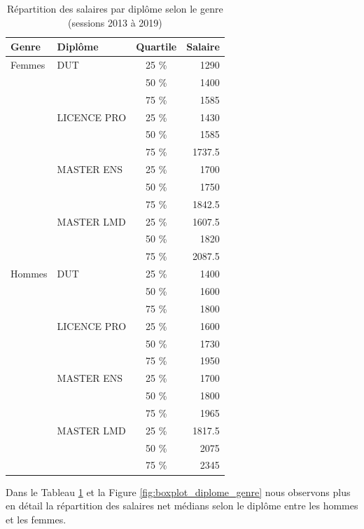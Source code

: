 \documentclass[12pt, a4paper, titlepage, table]{article}
\begin{document}
	\begin{table}[H]
		\centering
		\begin{tabular}{llcr}
			\toprule
			\textbf{Genre} & \textbf{Diplôme} & \textbf{Quartile} & \textbf{Salaire} \\
			\midrule
			Femmes & DUT & 25 \% & 1290 \\
			&     & 50 \% & 1400 \\
			&     & 75 \% & 1585 \\
			\cmidrule{2-4}
			& LICENCE PRO & 25 \% & 1430 \\
			&             & 50 \% & 1585 \\
			&             & 75 \% & 1737.5 \\
			\cmidrule{2-4}
			& MASTER ENS & 25 \% & 1700 \\
			&            & 50 \% & 1750 \\
			&            & 75 \% & 1842.5 \\
			\cmidrule{2-4}
			& MASTER LMD & 25 \% & 1607.5 \\
			&            & 50 \% & 1820 \\
			&            & 75 \% & 2087.5 \\
			\midrule
			Hommes & DUT & 25 \%& 1400 \\
			&     		& 50 \% & 1600 \\
			&     & 75 \% & 1800 \\
			\cmidrule{2-4}
			& LICENCE PRO & 25 \% & 1600 \\
			&             & 50 \% & 1730 \\
			&             & 75 \% & 1950 \\
			\cmidrule{2-4}
			& MASTER ENS & 25 \% & 1700 \\
			&            & 50 \% & 1800 \\
			&            & 75 \% & 1965 \\
			\cmidrule{2-4}
			& MASTER LMD & 25 \% & 1817.5 \\
			&            & 50 \% & 2075 \\
			&            & 75 \% & 2345 \\
			\bottomrule
		\end{tabular}
		\caption{Répartition des salaires par diplôme selon le genre (sessions 2013 à 2019)}
		\label{tab:quartile_values_diplome}
	\end{table}
	
	
	Dans le Tableau \ref{tab:quartile_values_diplome} et la Figure \ref{fig:boxplot_diplome_genre} nous observons plus en détail la répartition des salaires net médians selon le diplôme entre les hommes et les femmes.
	
\end{document}
